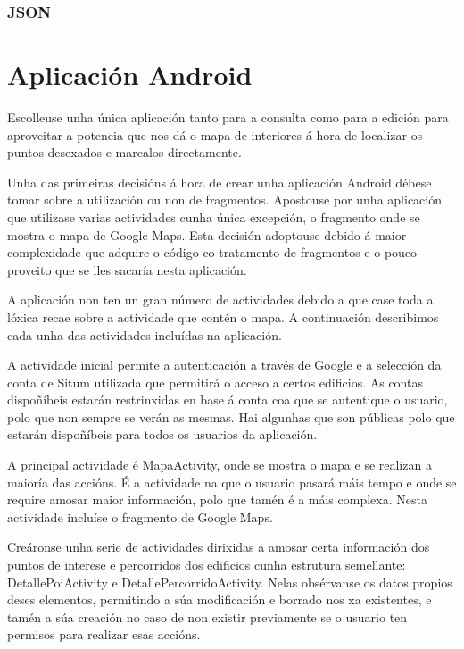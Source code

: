 \subsubsection{JSON}


\section{Aplicación Android}
Escolleuse unha única aplicación tanto para a consulta como para a edición para aproveitar a potencia que nos dá o mapa de interiores á hora de localizar os puntos desexados e marcalos directamente.

Unha das primeiras decisións á hora de crear unha aplicación Android débese tomar sobre a utilización ou non de fragmentos. Apostouse por unha aplicación que utilizase varias actividades cunha única excepción, o fragmento onde se mostra o mapa de Google Maps. Esta decisión adoptouse debido á maior complexidade que adquire o código co tratamento de fragmentos e o pouco proveito que se lles sacaría nesta aplicación.

A aplicación non ten un gran número de actividades debido a que case toda a lóxica recae sobre a actividade que contén o mapa. A continuación describimos cada unha das actividades incluídas na aplicación.

A actividade inicial permite a autenticación a través de Google e a selección da conta de Situm utilizada que permitirá o acceso a certos edificios. As contas dispoñíbeis estarán restrinxidas en base á conta coa que se autentique o usuario, polo que non sempre se verán as mesmas. Hai algunhas que son públicas polo que estarán dispoñíbeis para todos os usuarios da aplicación.

A principal actividade é MapaActivity, onde se mostra o mapa e se realizan a maioría das accións. É a actividade na que o usuario pasará máis tempo e onde se require amosar maior información, polo que tamén é a máis complexa. Nesta actividade incluíse o fragmento de Google Maps.

Creáronse unha serie de actividades dirixidas a amosar certa información dos puntos de interese e percorridos dos edificios cunha estrutura semellante: DetallePoiActivity e DetallePercorridoActivity. Nelas obsérvanse os datos propios deses elementos, permitindo a súa modificación e borrado nos xa existentes, e tamén a súa creación no caso de non existir previamente se o usuario ten permisos para realizar esas accións.





